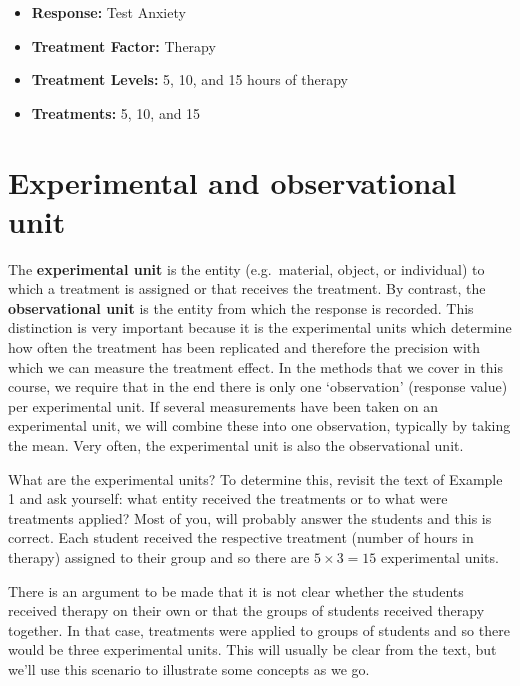\documentclass[
  letterpaper,
]{book}
\providecommand{\tightlist}{%
  \setlength{\itemsep}{0pt}\setlength{\parskip}{0pt}}\usepackage{longtable,booktabs,array}
\begin{document}
\begin{itemize}
\tightlist
\item
  \textbf{Response:} Test Anxiety\\
\item
  \textbf{Treatment Factor:} Therapy\\
\item
  \textbf{Treatment Levels:} 5, 10, and 15 hours of therapy\\
\item
  \textbf{Treatments:} 5, 10, and 15
\end{itemize}

\section*{\texorpdfstring{\textbf{Experimental and observational
unit}}{Experimental and observational unit}}\label{experimental-and-observational-unit}


The \textbf{experimental unit} is the entity (e.g.~material, object, or
individual) to which a treatment is assigned or that receives the
treatment. By contrast, the \textbf{observational unit} is the entity
from which the response is recorded. This distinction is very important
because it is the experimental units which determine how often the
treatment has been replicated and therefore the precision with which we
can measure the treatment effect. In the methods that we cover in this
course, we require that in the end there is only one `observation'
(response value) per experimental unit. If several measurements have
been taken on an experimental unit, we will combine these into one
observation, typically by taking the mean. Very often, the experimental
unit is also the observational unit.

What are the experimental units? To determine this, revisit the text of
Example 1 and ask yourself: what entity received the treatments or to
what were treatments applied? Most of you, will probably answer the
students and this is correct. Each student received the respective
treatment (number of hours in therapy) assigned to their group and so
there are \(5 \times 3 = 15\) experimental units.

There is an argument to be made that it is not clear whether the
students received therapy on their own or that the groups of students
received therapy together. In that case, treatments were applied to
groups of students and so there would be three experimental units. This
will usually be clear from the text, but we'll use this scenario to
illustrate some concepts as we go.
\end{document}
